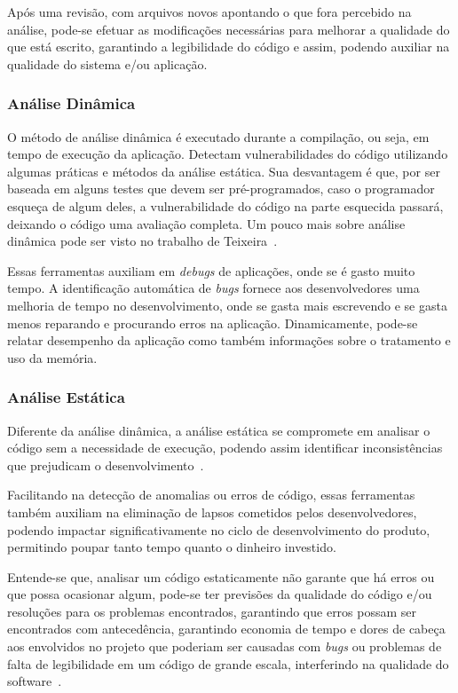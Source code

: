 \documentclass[11pt,a4paper,usenames,dvipsnames]{article}
\begin{document}
Após uma revisão, com arquivos novos apontando o que fora percebido na análise, pode-se efetuar as modificações necessárias para melhorar a qualidade do que está escrito, garantindo a legibilidade do código e assim, podendo auxiliar na qualidade do sistema e/ou aplicação.

\subsubsection{Análise Dinâmica}

O método de análise dinâmica é executado durante a compilação, ou seja, em tempo de execução da aplicação. Detectam vulnerabilidades do código utilizando algumas práticas e métodos da análise estática. Sua desvantagem é que, por ser baseada em alguns testes que devem ser pré-programados, caso o programador esqueça de algum deles, a vulnerabilidade do código na parte esquecida passará, deixando o código uma avaliação completa. Um pouco mais sobre análise dinâmica pode ser visto no trabalho de Teixeira~\cite{teixeira2007ferramenta}.

Essas ferramentas auxiliam em \textit{debugs} de aplicações, onde se é gasto muito tempo. A identificação automática de \textit{bugs} fornece aos desenvolvedores uma melhoria de tempo no desenvolvimento, onde se gasta mais escrevendo e se gasta menos reparando e procurando erros na aplicação. Dinamicamente, pode-se relatar desempenho da aplicação como também informações sobre o tratamento e uso da memória.

\subsubsection{Análise Estática}

Diferente da análise dinâmica, a análise estática se compromete em analisar o código sem a necessidade de execução, podendo assim identificar inconsistências que prejudicam o desenvolvimento~\cite{Analysis}.

Facilitando na detecção de anomalias ou erros de código, essas ferramentas também auxiliam na eliminação de lapsos cometidos pelos desenvolvedores, podendo impactar significativamente no ciclo de desenvolvimento do produto, permitindo poupar tanto tempo quanto o dinheiro investido\cite{teixeira2007avaliaccao}.

Entende-se que, analisar um código estaticamente não garante que há erros ou que possa ocasionar algum, pode-se ter previsões da qualidade do código e/ou resoluções para os problemas encontrados, garantindo que erros possam ser encontrados com antecedência, garantindo economia de tempo e dores de cabeça aos envolvidos no projeto que poderiam ser causadas com \textit{bugs} ou problemas de falta de legibilidade em um código de grande escala, interferindo na qualidade do software~\cite{Opportunities}.  
\end{document}
